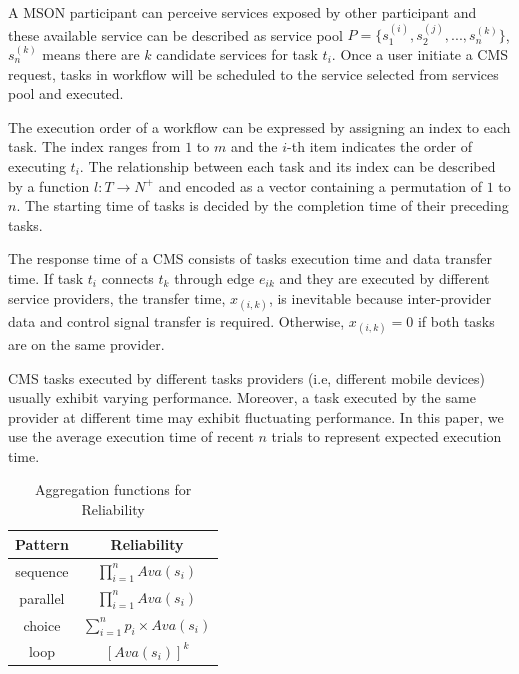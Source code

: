\documentclass[journal]{IEEEtran}
\begin{document}
A MSON participant can perceive services exposed by other participant and these available service can be described as service pool $P = \{s_1^{(i)}, s_2^{(j)}, ..., s_n^{(k)} \}$, $s_n^{(k)}$ means there are $k$ candidate services for task $t_i$. Once a user initiate a CMS request, tasks in workflow will be scheduled to the service selected from services pool and executed. 

The execution order of a workflow can be expressed by assigning an index to each task. The index ranges from $1$ to $m$ and the $i$-th item indicates the order of executing $t_i$. The relationship between each task and its index can be described by a function $l : T \rightarrow N^+$ and encoded as a vector containing a permutation of $1$ to $n$. The starting time of tasks is decided by the completion time of their preceding tasks.

The response time of a CMS consists of tasks execution time and data transfer time. If task $t_i$ connects $t_k$ through edge $e_{ik}$ and they are executed by different service providers, the transfer time, $x_{(i,k)}$, is inevitable because inter-provider data and control signal transfer is required. Otherwise, $x_{(i,k)} = 0 $ if both tasks are on the same provider.

CMS tasks executed by different tasks providers (i.e, different mobile devices) usually exhibit varying performance. Moreover, a task executed by the same provider at different time may exhibit fluctuating performance. In this paper, we use the average execution time of recent $n$ trials to represent expected execution time.

\begin{table}[!t]
\renewcommand{\arraystretch}{1.5}
\caption{Aggregation functions for Reliability}
\label{aggregation functions}
\centering
\begin{tabular}{cc}
\hline
\bfseries Pattern &  \bfseries Reliability \\
\hline
sequence &  $\prod_{i=1}^{n}Ava(s_i)$ \\
parallel &  $\prod_{i=1}^{n}Ava(s_i)$ \\
choice   &  $\sum_{i=1}^{n} p_i \times Ava(s_i)$ \\
loop     &  $[Ava(s_i)]^{k}$ \\
\hline
\end{tabular}
\end{table}
\end{document}
